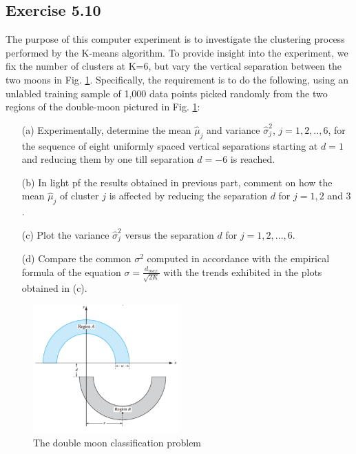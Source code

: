 \documentclass[a4paper, 12pt]{article}
\begin{document}
\subsection{Exercise 5.10}

The purpose of this computer experiment is to investigate the clustering process performed by the K-means algorithm. To provide insight into the experiment, we fix the number of clusters at K=6, but vary the vertical separation between the two moons in Fig. \ref{fig:moons}. Specifically, the requirement is to do the following, using an unlabled training sample of 1,000 data points picked randomly from the two regions of the double-moon pictured in Fig. \ref{fig:moons}:\\
\begin{itemize}
\item[(a)] Experimentally, determine the mean $\hat{\mu}_j$ and variance $\hat{\sigma}^2_j$, $j=1,2,..,6$, for the sequence of eight uniformly spaced vertical separations starting at $d=1$ and reducing them by one till separation $d=-6$ is reached.
\item[(b)] In light pf the results obtained in previous part, comment on how the mean $\hat{\mu}_j$ of cluster $j$ is affected by reducing the separation $d$ for $j=1,2$ and $3$.
\item[(c)] Plot the variance $\hat{\sigma}^2_j$ versus the separation $d$ for $j=1,2,...,6$.
\item[(d)] Compare the common $\sigma^2$ computed in accordance with the empirical formula of the equation $\sigma = \frac{d_{max}}{\sqrt{2K}}$ with the trends exhibited in the plots obtained in (c).
\end{itemize}

\begin{figure}[h]
  \centering
  \caption{The double moon classification problem \label{fig:moons}}
  \includegraphics[width=0.5\textwidth]{moons}
\end{figure}
\end{document}
